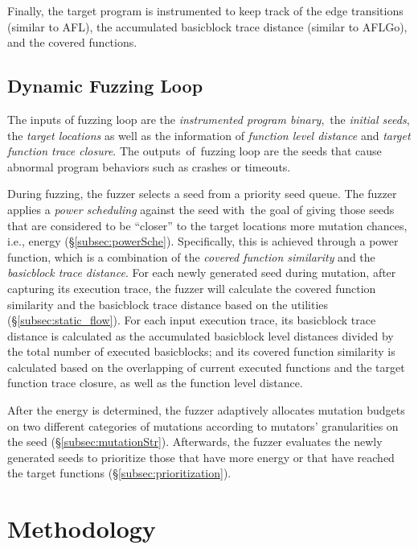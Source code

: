 Finally, the target program is instrumented to keep track of the edge transitions (similar to AFL), the accumulated basicblock trace distance (similar to AFLGo), and the covered functions.


\subsection{Dynamic Fuzzing Loop}\label{sec:fuzz_flow}

The inputs of fuzzing loop are the \textit{instrumented program binary},~the \textit{initial seeds}, the \textit{target locations} as well as the information of \textit{function level distance} and \textit{target function trace closure}.
The outputs~of~fuzzing loop are the seeds that cause abnormal program behaviors such as crashes or timeouts.

During fuzzing, the fuzzer selects a seed from a priority seed queue. The fuzzer applies a \textit{power scheduling} against the seed with~the goal of giving those seeds that are considered to be ``closer'' to the target locations more mutation chances, i.e., energy (\S\ref{subsec:powerSche}). Specifically, this is achieved through a power function, which is a combination of the \textit{covered function similarity} and the \textit{basicblock trace distance}. For each newly generated seed during mutation, after capturing its execution trace, the fuzzer will calculate the covered function similarity and the basicblock trace distance based on the utilities (\S\ref{subsec:static_flow}). For each input execution trace, its basicblock trace distance is calculated as the accumulated basicblock level distances divided by the total number of executed basicblocks; and its covered function similarity is calculated based on the overlapping of current executed functions and the target function trace closure, as well as the function level distance.

After the energy is determined, the fuzzer adaptively allocates mutation budgets on two different categories of mutations according to mutators' granularities on the seed (\S\ref{subsec:mutationStr}).
Afterwards, the fuzzer evaluates the newly generated seeds to prioritize those that have more energy or that have reached the target functions (\S\ref{subsec:prioritization}).



\section{Methodology}

